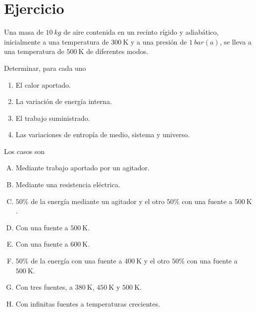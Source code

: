 \section{Ejercicio}\label{ej:Chap07Ejercicio23}
Una masa de $\SI{10}{kg}$ de aire contenida en un recinto rígido y adiabático, inicialmente a una temperatura de $\SI{300}{\kelvin}$ y a una presión de $\SI{1}{bar(a)}$, se lleva a una temperatura de $\SI{500}{\kelvin}$ de diferentes modos.

Determinar, para cada uno
\begin{enumerate}
    \item El calor aportado.
    \item La variación de energía interna.
    \item El trabajo suministrado.
    \item Las variaciones de entropía de medio, sistema y universo.
\end{enumerate}

Los casos son
\begin{enumerate}[A.]
    \item Mediante trabajo aportado por un agitador.
    \item Mediante una resistencia eléctrica.
    \item $50\%$ de la energía mediante un agitador y el otro $50\%$ con una fuente a $\SI{500}{\kelvin}$.
    \item Con una fuente a $\SI{500}{\kelvin}$.
    \item Con una fuente a $\SI{600}{\kelvin}$.
    \item $50\%$ de la energía con una fuente a $\SI{400}{\kelvin}$ y el otro $50\%$ con una fuente a $\SI{500}{\kelvin}$.
    \item Con tres fuentes, a $\SI{380}{\kelvin}$, $\SI{450}{\kelvin}$ y $\SI{500}{\kelvin}$.
    \item Con infinitas fuentes a temperaturas crecientes.
\end{enumerate}